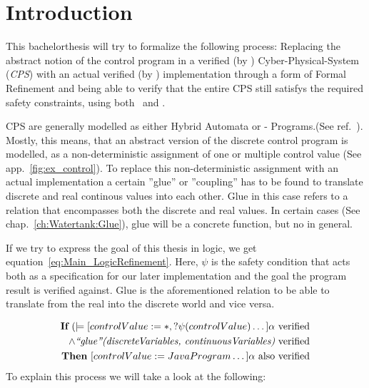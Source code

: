 
\chapter{Introduction}
\label{ch:Introduction}

This bachelorthesis will try to formalize the following process: Replacing the abstract notion of the control program in a verified (by \keym) Cyber-Physical-System (\textit{CPS}) with an actual verified (by \key) implementation through a form of Formal Refinement and being able to verify that the entire CPS still satisfys the required safety constraints, using both \keym~and \key. 

CPS are generally modelled as either Hybrid Automata or - Programs.(See ref.~\cite{platzer2010b}). Mostly, this means, that an abstract version of the discrete control program is modelled, as a non-deterministic assignment of one or multiple control value (See app.~\ref{fig:ex_control}). To replace this non-deterministic assignment with an actual implementation a certain ''glue'' or ''coupling'' has to be found to translate discrete and real continous values into each other. Glue in this case refers to a relation that encompasses both the discrete and real values. In certain cases (See chap.~\ref{ch:Watertank:Glue}), glue will be a concrete function, but no in general.

If we try to express the goal of this thesis in logic, we get equation~\ref{eq:Main_LogicRefinement}. Here, \(\psi\) is the safety condition that acts both as a specification for our later implementation and the goal the program result is verified against. Glue is the aforementioned relation to be able to translate from the real into the discrete world and vice versa.

\begin{equation}
\centering
\begin{split}
\textbf{If}~ (\models [ controlValue := \ast, ?\psi(controlValue) \dots] \alpha~\textrm{verified} \\ \wedge \textit{``glue''(discreteVariables, continuousVariables)}~\textrm{verified} \\
\textbf{Then}~ [controlValue := JavaProgram \dots] \alpha~\textrm{also verified}
\end{split}
\label{eq:Main_LogicRefinement}
\end{equation} To explain this process we will take a look at the following: 

